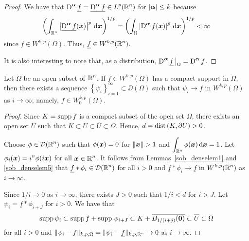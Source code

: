 \begin{proof}
 We have that $\displaystyle \operatorname{D}^{{\bm{\alpha}}} \underline{f}
= \underline{\operatorname{D}^{{\bm{\alpha}}} f} \in L^p(\mathbb{R}^n)$ for
$|{\bm{\alpha}}|\leq k$ because 
\[
\left( \int_{\mathbb{R}^n} \left|\underline{\operatorname{D}^{{\bm{\alpha}}} f}({\bm{x}})\right|^p
\,\mathrm{d}{{\bm{x}}}\right)^{1/p} = 
\left( \int_{\Omega} \left| \operatorname{D}^{{\bm{\alpha}}} f({\bm{x}}) \right|^p
\,\mathrm{d}{{\bm{x}}}\right)^{1/p} < \infty
\]
since $\displaystyle f \in W^{k,p}(\Omega)$.  Thus,
$\displaystyle \underline{f} \in W^{k,p}(\mathbb{R}^n)$.

It is also interesting to note that, as a distribution,
$\displaystyle \operatorname{D}^{{\bm{\alpha}}} \underline{f}\,\big|_{\Omega}
= \operatorname{D}^{{\bm{\alpha}}} f$.
\end{proof}

\begin{lemma} \label{sob_w0_trad1}
Let $\Omega$ be an open subset of $\displaystyle \mathbb{R}^n$.
If $\displaystyle f \in W^{k,p}(\Omega)$ has a compact support in
$\Omega$, then there exists a sequence
$\displaystyle \left\{ \psi_i \right\}_{i=1}^\infty \subset \DD(\Omega)$
such that $\psi_i \to f$ in $\displaystyle W^{k,p}(\Omega)$ as
$i \to \infty$; namely, $\displaystyle f\in W^{k,p}_0(\Omega)$.
\end{lemma}

\begin{proof}
Since $K = \operatorname{supp} f$ is a compact subset of the open set $\Omega$,
there exists an open set $U$ such that
$K \subset U \subset \overline{U} \subset \Omega$.  Hence,
$\displaystyle d = \mathrm{dist}\left(K,\partial U\right) > 0$. 

Choose $\displaystyle \phi \in \mathcal{D}(\mathbb{R}^n)$ such that
$\phi({\bm{x}}) = 0$ for $\|\VEC{x}\|>1$ and
$\displaystyle \int_{\mathbb{R}^n} \phi({\bm{x}}) \,\mathrm{d}{{\bm{x}}} = 1$.
Let $\displaystyle \phi_i({\bm{x}}) = i^n\phi(i {\bm{x}})$ for all
$\displaystyle {\bm{x}} \in \mathbb{R}^n$.
It follows from Lemmas~\ref{sob_denselem1} and
\ref{sob_denselem5} that 
$\displaystyle \underline{f} \ast \phi_i \in \mathcal{D}(\mathbb{R}^n)$ for all $i>0$
and
$\underline{f} \ast \phi_i \to \underline{f}$ in
$\displaystyle W^{k,p}(\mathbb{R}^n)$ as $i \to \infty$.

Since $1/i \to 0$ as $i\to \infty$, there exists $J>0$ such that $1/i<d$
for $i > J$.  Let $\psi_i = \underline{f} \ast \phi_{i+J}$ for $i>0$.
We have that
\[
  \operatorname{supp} \psi_i \subset \operatorname{supp} f + \operatorname{supp}\, \phi_{i+J}
  \subset K + \overline{B_{1/(i+j)}({\bm{0}})}
  \subset \overline{U} \subset \Omega
\]
for all $i >0$ and
$\displaystyle \| \psi_i - f \|_{k,p,\Omega}
= \| \psi_i - \underline{f} \|_{k,p,\mathbb{R}^n} \to 0$
as $i \to \infty$.
\end{proof}


